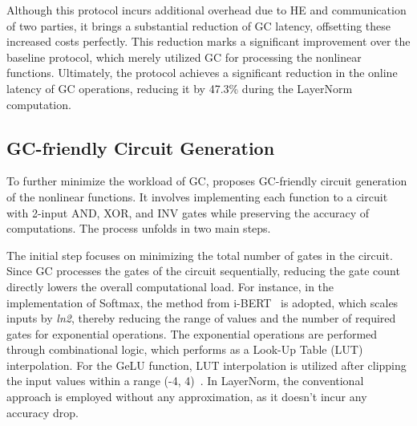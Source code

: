 Although this protocol incurs additional overhead due to HE and communication of two parties, it brings a substantial reduction of GC latency, offsetting these increased costs perfectly. This reduction marks a significant improvement over the baseline protocol, which merely utilized GC for processing the nonlinear functions. Ultimately, the \sysname protocol achieves a significant reduction in the online latency of GC operations, reducing it by 47.3\% during the LayerNorm computation.

\subsection{GC-friendly Circuit Generation}

To further minimize the workload of GC, \sysname proposes GC-friendly circuit generation of the nonlinear functions. It involves implementing each function to a circuit with 2-input AND, XOR, and INV gates while preserving the accuracy of computations. The process unfolds in two main steps.

The initial step focuses on minimizing the total number of gates in the circuit. Since GC processes the gates of the circuit sequentially, reducing the gate count directly lowers the overall computational load. For instance, in the implementation of Softmax, the method from i-BERT~\cite{kim2021bert} is adopted, which scales inputs by \textit{ln2}, thereby reducing the range of values and the number of required gates for exponential operations. The exponential operations are performed through combinational logic, which performs as a Look-Up Table (LUT) interpolation. For the GeLU function, LUT interpolation is utilized after clipping the input values within a range (-4, 4)~\cite{gupta2023sigma}. In LayerNorm, the conventional approach is employed without any approximation, as it doesn't incur any accuracy drop.

